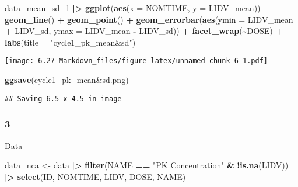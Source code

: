 \documentclass[
]{article}
\newenvironment{Shaded}{\begin{snugshade}}{\end{snugshade}}
\newcommand{\AttributeTok}[1]{\textcolor[rgb]{0.13,0.29,0.53}{#1}}
\newcommand{\FunctionTok}[1]{\textcolor[rgb]{0.13,0.29,0.53}{\textbf{#1}}}
\newcommand{\NormalTok}[1]{#1}
\newcommand{\OtherTok}[1]{\textcolor[rgb]{0.56,0.35,0.01}{#1}}
\newcommand{\SpecialCharTok}[1]{\textcolor[rgb]{0.81,0.36,0.00}{\textbf{#1}}}
\newcommand{\StringTok}[1]{\textcolor[rgb]{0.31,0.60,0.02}{#1}}
\begin{document}
\begin{Shaded}
\begin{Highlighting}[]
\NormalTok{data\_mean\_sd\_1 }\SpecialCharTok{|\textgreater{}}
  \FunctionTok{ggplot}\NormalTok{(}\FunctionTok{aes}\NormalTok{(}\AttributeTok{x =}\NormalTok{ NOMTIME, }\AttributeTok{y =}\NormalTok{ LIDV\_mean)) }\SpecialCharTok{+} \FunctionTok{geom\_line}\NormalTok{() }\SpecialCharTok{+} \FunctionTok{geom\_point}\NormalTok{() }\SpecialCharTok{+}
  \FunctionTok{geom\_errorbar}\NormalTok{(}\FunctionTok{aes}\NormalTok{(}\AttributeTok{ymin =}\NormalTok{ LIDV\_mean }\SpecialCharTok{+}\NormalTok{ LIDV\_sd, }\AttributeTok{ymax =}\NormalTok{ LIDV\_mean }\SpecialCharTok{{-}}\NormalTok{ LIDV\_sd)) }\SpecialCharTok{+}
  \FunctionTok{facet\_wrap}\NormalTok{(}\SpecialCharTok{\textasciitilde{}}\NormalTok{DOSE) }\SpecialCharTok{+} \FunctionTok{labs}\NormalTok{(}\AttributeTok{title =} \StringTok{"cycle1\_pk\_mean\&sd"}\NormalTok{)}
\end{Highlighting}
\end{Shaded}

\texttt{[image: 6.27-Markdown\_files/figure-latex/unnamed-chunk-6-1.pdf]}

\begin{Shaded}
\begin{Highlighting}[]
\FunctionTok{ggsave}\NormalTok{(}\StringTok{\textquotesingle{}cycle1\_pk\_mean\&sd.png\textquotesingle{}}\NormalTok{)}
\end{Highlighting}
\end{Shaded}

\begin{verbatim}
## Saving 6.5 x 4.5 in image
\end{verbatim}

\hypertarget{section-3}{%
\subsubsection{3}\label{section-3}}

Data

\begin{Shaded}
\begin{Highlighting}[]
\NormalTok{data\_nca }\OtherTok{\textless{}{-}}\NormalTok{ data }\SpecialCharTok{|\textgreater{}}
  \FunctionTok{filter}\NormalTok{(NAME }\SpecialCharTok{==} \StringTok{"PK Concentration"} \SpecialCharTok{\&} \SpecialCharTok{!}\FunctionTok{is.na}\NormalTok{(LIDV)) }\SpecialCharTok{|\textgreater{}}
  \FunctionTok{select}\NormalTok{(ID, NOMTIME, LIDV, DOSE, NAME)}
\end{Highlighting}
\end{Shaded}
\end{document}
